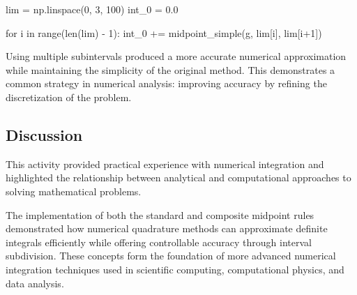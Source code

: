 \documentclass[../portafolio.tex]{subfiles}
\begin{document}
\begin{listing}
\begin{pythoncode}
lim = np.linspace(0, 3, 100)
int_0 = 0.0

for i in range(len(lim) - 1):
    int_0 += midpoint_simple(g, lim[i], lim[i+1])
\end{pythoncode}
\caption{Composite Midpoint Rule implementation.}
\label{codci}
\end{listing}

Using multiple subintervals produced a more accurate numerical approximation while maintaining the simplicity of the original method. This demonstrates a common strategy in numerical analysis: improving accuracy by refining the discretization of the problem.

\subsection{Discussion}

This activity provided practical experience with numerical integration and highlighted the relationship between analytical and computational approaches to solving mathematical problems.

The implementation of both the standard and composite midpoint rules demonstrated how numerical quadrature methods can approximate definite integrals efficiently while offering controllable accuracy through interval subdivision. These concepts form the foundation of more advanced numerical integration techniques used in scientific computing, computational physics, and data analysis.
\end{document}
